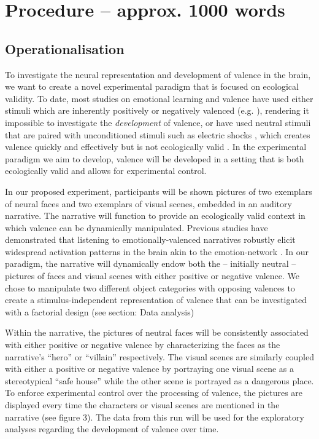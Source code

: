 \documentclass[12pt,a4paper]{article}\usepackage[]{graphicx}\usepackage[]{color}
\begin{document}
\noindent
\wordcount 

\section{Procedure \textmd{– approx. 1000 words}}
\subsection{Operationalisation}
To investigate the neural representation and development of valence in the brain, we want to create a novel experimental paradigm that is focused on ecological validity. To date, most studies on emotional learning and valence have used either stimuli which are inherently positively or negatively valenced (e.g. \citealp{baucom2012,aldhafeeri2012}), rendering it impossible to investigate the \emph{development} of valence, or have used neutral stimuli that are paired with unconditioned stimuli such as electric shocks \citep{visser2013}, which creates valence quickly and effectively but is not ecologically valid \citep{spiers2007}. In the experimental paradigm we aim to develop, valence will be developed in a setting that is both ecologically valid and allows for experimental control. 

In our proposed experiment, participants will be shown pictures of two exemplars of neural faces and two exemplars of visual scenes, embedded in an auditory narrative. The narrative will function to provide an ecologically valid context in which valence can be dynamically manipulated. Previous studies have demonstrated that listening to emotionally-valenced narratives robustly elicit widespread activation patterns in the brain \citep{nijhof2015,mar2011} akin to the emotion-network \citep{sabatinelli2006}. In our paradigm, the narrative will dynamically endow both the -- initially neutral -- pictures of faces and visual scenes with either positive or negative valence. We chose to manipulate two different object categories with opposing valences to create a stimulus-independent representation of valence that can be investigated with a factorial design (see section: Data analysis)

Within the narrative, the pictures of neutral faces will be consistently associated with either positive or negative valence by characterizing the faces as the narrative's ``hero'' or ``villain'' respectively. The visual scenes are similarly coupled with either a positive or negative valence by portraying one visual scene as a stereotypical ``safe house'' while the other scene is portrayed as a dangerous place. To enforce experimental control over the processing of valence, the pictures are displayed every time the characters or visual scenes are mentioned in the narrative (see figure 3). The data from this run will be used for the exploratory analyses regarding the development of valence over time.
\end{document}
